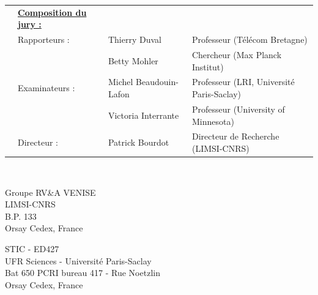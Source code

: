 \begin{titlepage}
\begin{center}
  \begin{tabular}{p{0cm} p{3.6cm} p{4.5cm} l }
    & \footnotesize\bf\underline{Composition du jury :}& &\\
    & \footnotesize{Rapporteurs} : 	& Thierry Duval	& \footnotesize{Professeur (Télécom Bretagne)} \\	
    &							&  Betty Mohler		& \footnotesize{Chercheur (Max Planck Institut)} \\
    & \footnotesize{Examinateurs} : 	& Michel Beaudouin-Lafon & \footnotesize{Professeur (LRI, Universit\'e Paris-Saclay)} \\
    &             & Victoria Interrante & \footnotesize{Professeur (University of Minnesota)} \\
    & \footnotesize{Directeur} :	& Patrick Bourdot & \footnotesize{Directeur de Recherche (LIMSI-CNRS)} \\
  \end{tabular}
\end{center}

\clearpage
\newpage
\thispagestyle{empty}   

\mbox{~} %

\vfill 

\setlength{\columnsep}{7mm}
\setlength{\columnseprule}{0pt}

\begin{multicols}{2} 
\small 
\noindent Groupe RV\&A VENISE 	\\	
\noindent LIMSI-CNRS					\\
\noindent B.P. 133				\\
 Orsay Cedex, France \\	

\columnbreak

\raggedleft STIC - ED427 \\
\noindent UFR Sciences - Université Paris-Saclay \\
\noindent Bat 650 PCRI bureau 417 - Rue Noetzlin  \\
 Orsay Cedex, France
\end{multicols}

\end{titlepage}